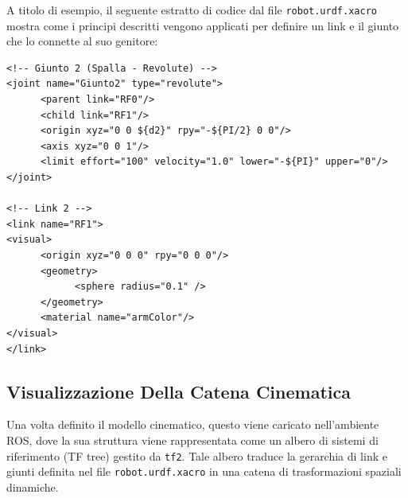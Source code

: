 \documentclass[11pt, a4paper]{report}
\begin{document}
A titolo di esempio, il seguente estratto di codice dal file \texttt{robot.urdf.xacro} mostra come i principi descritti vengono applicati per definire un link e il giunto che lo connette al suo genitore:

\begin{lstlisting}[style=XMLStyle]
<!-- Giunto 2 (Spalla - Revolute) -->
<joint name="Giunto2" type="revolute">
      <parent link="RF0"/>
      <child link="RF1"/>
      <origin xyz="0 0 ${d2}" rpy="-${PI/2} 0 0"/>
      <axis xyz="0 0 1"/>
      <limit effort="100" velocity="1.0" lower="-${PI}" upper="0"/>
</joint>

<!-- Link 2 -->
<link name="RF1">
<visual>
      <origin xyz="0 0 0" rpy="0 0 0"/>
      <geometry>
            <sphere radius="0.1" />
      </geometry>
      <material name="armColor"/>
</visual>
</link>
\end{lstlisting}
\newpage
\subsection{Visualizzazione Della Catena Cinematica}
\label{subsec:catena_cinematica_world}

Una volta definito il modello cinematico, questo viene caricato nell'ambiente ROS, dove la sua struttura viene rappresentata come un albero di sistemi di riferimento (TF tree) gestito da \texttt{tf2}. Tale albero traduce la gerarchia di link e giunti definita nel file \texttt{robot.urdf.xacro} in una catena di trasformazioni spaziali dinamiche.
\end{document}
